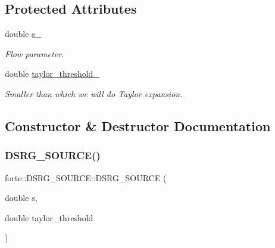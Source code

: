 \subsection*{Protected Attributes}
\begin{DoxyCompactItemize}
\item 
double \mbox{\hyperlink{classforte_1_1_d_s_r_g___s_o_u_r_c_e_ab83311b0d70b05f301b80bcb9abaf76e}{s\+\_\+}}
\begin{DoxyCompactList}\small\item\em Flow parameter. \end{DoxyCompactList}\item 
double \mbox{\hyperlink{classforte_1_1_d_s_r_g___s_o_u_r_c_e_aaf7ea285612472cefc31e0de08856701}{taylor\+\_\+threshold\+\_\+}}
\begin{DoxyCompactList}\small\item\em Smaller than which we will do Taylor expansion. \end{DoxyCompactList}\end{DoxyCompactItemize}


\subsection{Constructor \& Destructor Documentation}
\mbox{\label{classforte_1_1_d_s_r_g___s_o_u_r_c_e_a755f7db2ada7a0028f8b6427990d66e0}} 
\subsubsection{\texorpdfstring{D\+S\+R\+G\+\_\+\+S\+O\+U\+R\+C\+E()}{DSRG\_SOURCE()}}
{\footnotesize\ttfamily forte\+::\+D\+S\+R\+G\+\_\+\+S\+O\+U\+R\+C\+E\+::\+D\+S\+R\+G\+\_\+\+S\+O\+U\+R\+CE (\begin{DoxyParamCaption}\item[{double}]{s,  }\item[{double}]{taylor\+\_\+threshold }\end{DoxyParamCaption})}


